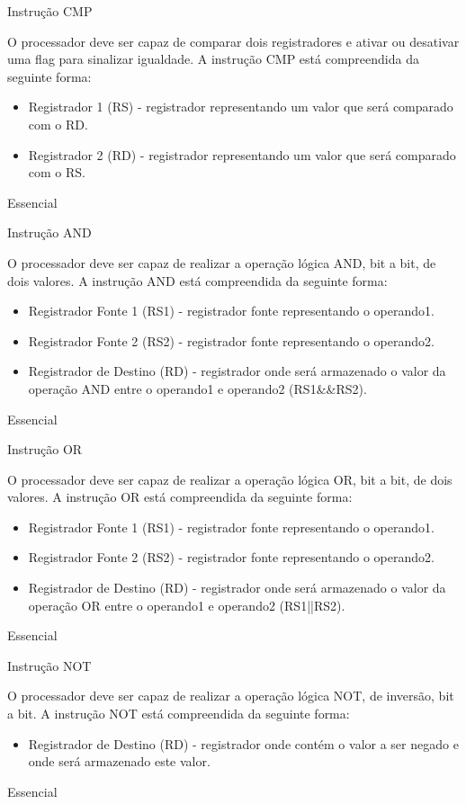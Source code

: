 \documentclass{article}
\begin{document}
\begin{functional}
     \requirement
      {Instrução CMP}
      {O processador deve ser capaz de comparar dois registradores e ativar ou desativar uma flag para sinalizar igualdade.
      A instrução CMP está compreendida da seguinte forma:\\
      \begin{itemize}
       \item Registrador 1 (RS) - registrador representando um valor que será comparado com o RD.
       \item Registrador 2 (RD) - registrador representando um valor que será comparado com o RS.
      \end{itemize}
      }
      {Essencial}

      \requirement
      {Instrução AND}
      {O processador deve ser capaz de realizar a operação lógica AND, bit a bit, de dois valores.
      A instrução AND está compreendida da seguinte forma:\\
       \begin{itemize}
        \item Registrador Fonte 1 (RS1) - registrador fonte representando o operando1.
        \item Registrador Fonte 2 (RS2) - registrador fonte representando o operando2.
        \item Registrador de Destino (RD) - registrador onde será armazenado o valor da operação AND entre o operando1 e operando2 (RS1\&\&RS2).
       \end{itemize}
       }
      {Essencial}

      \requirement
      {Instrução OR}
      {O processador deve ser capaz de realizar a operação lógica OR, bit a bit, de dois valores.
      A instrução OR está compreendida da seguinte forma:\\
       \begin{itemize}
        \item Registrador Fonte 1 (RS1) - registrador fonte representando o operando1.
        \item Registrador Fonte 2 (RS2) - registrador fonte representando o operando2.
        \item Registrador de Destino (RD) - registrador onde será armazenado o valor da operação OR entre o operando1 e operando2 (RS1||RS2).
       \end{itemize}
       }
      {Essencial}

      \requirement
      {Instrução NOT}
      {O processador deve ser capaz de realizar a operação lógica NOT, de inversão, bit a bit.
      A instrução NOT está compreendida da seguinte forma:\\
       \begin{itemize}
         \item Registrador de Destino (RD) - registrador onde contém o valor a ser negado e onde será armazenado este valor.
         \end{itemize}
         }
      {Essencial}
      

\end{functional}
\end{document}
